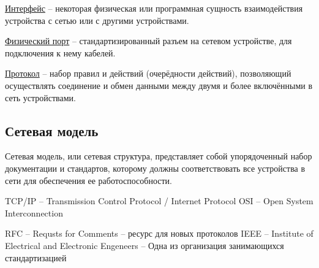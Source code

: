 \documentclass{article}
\begin{document}
\underline{Интерфейс} -- некоторая физическая или программная сущность взаимодействия устройства с сетью или с другими устройствами.

\underline{Физический порт} -- стандартизированный разъем на сетевом устройстве, для подключения к нему кабелей.

\underline{Протокол} -- набор правил и действий (очерёдности действий), позволяющий осуществлять соединение и обмен данными между двумя и более включёнными в сеть устройствами.

\subsection{Сетевая модель}

Сетевая модель, или сетевая структура, представляет собой упорядоченный набор документации и стандартов, которому должны соответствовать все устройства в сети для обеспечения ее работоспособности.

TCP/IP -- Transmission Control Protocol / Internet Protocol
OSI -- Open System Interconnection

RFC -- Requsts for Comments -- ресурс для новых протоколов
IEEE -- Institute of Electrical and Electronic Engeneers -- Одна из организация занимающихся стандартизацией
\end{document}
